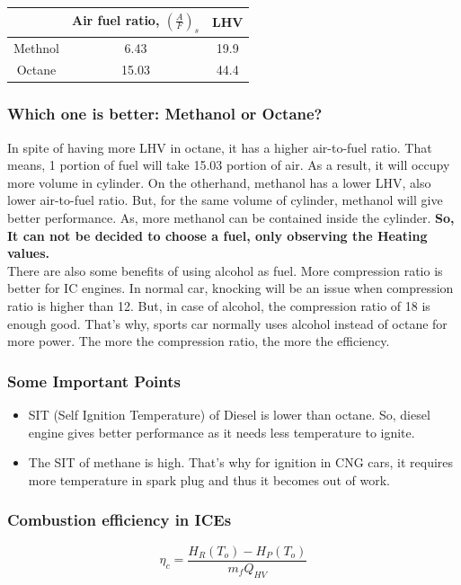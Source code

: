 \documentclass{article}
\begin{document}
\vspace*{0.5cm}
\begin{center}
  \begin{tabular}{ccc}
    \hline
     & Air fuel ratio, $\left(\frac{A}{F}\right)_s$ & LHV \\
    \hline
   Methnol & 6.43 & 19.9 \\
    Octane & 15.03 & 44.4 \\
    \hline
  \end{tabular}
  \end{center}

  \subsubsection*{Which one is better: Methanol or Octane?}
  In spite of having more LHV in octane, it has a higher air-to-fuel ratio. That means, 1 portion of fuel will take 15.03 portion of air. As a result, it will occupy more volume in cylinder. On the otherhand, methanol has a lower LHV, also lower air-to-fuel ratio. But, for the same volume of cylinder, methanol will give better performance. As, more methanol can be contained inside the cylinder. \textbf{So, It can not be decided to choose a fuel, only observing the Heating values.}\\
  There are also some benefits of using alcohol as fuel. More compression ratio is better for IC engines. In normal car, knocking will be an issue when compression ratio is higher than 12. But, in case of alcohol, the compression ratio of 18 is enough good. That's why, sports car normally uses alcohol instead of octane for more power. The more the compression ratio, the more the efficiency. 
  
  \subsubsection*{Some Important Points}
  \begin{itemize}
    \item SIT (Self Ignition Temperature) of Diesel is lower than octane. So, diesel engine gives better performance as it needs less temperature to ignite. 
    \item The SIT of methane is high. That's why for ignition in CNG cars, it requires more temperature in spark plug and thus it becomes out of work. 
  \end{itemize}

  \subsubsection*{Combustion efficiency in ICEs}
  $$\eta_c = \frac{H_R (T_o) - H_P (T_o)}{m_f Q_{HV}}$$
\end{document}
